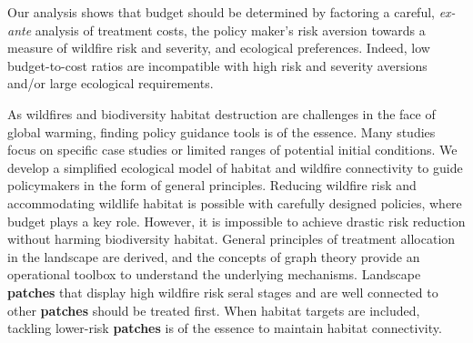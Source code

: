 Our analysis shows that budget should be determined by factoring a careful, \textit{ex-ante} analysis of treatment costs, the policy maker's risk aversion towards a measure of wildfire risk and severity, and ecological preferences.  Indeed, low budget-to-cost ratios are incompatible with high risk and severity aversions and/or large ecological requirements.

As wildfires and biodiversity habitat destruction are challenges in the face of global warming, finding policy guidance tools is of the essence. Many studies focus on specific case studies or limited ranges of potential initial conditions. We develop a simplified ecological model of habitat and wildfire connectivity to guide policymakers in the form of general principles. Reducing wildfire risk and accommodating wildlife habitat is possible with carefully designed policies, where budget plays a key role. However, it is impossible to achieve drastic risk reduction without harming biodiversity habitat. General principles of treatment allocation in the landscape are derived, and the concepts of graph theory provide an operational toolbox to understand the underlying mechanisms. Landscape \textbf{patches} that display high wildfire risk seral stages and are well connected to other \textbf{patches} should be treated first. When habitat targets are included, tackling lower-risk \textbf{patches} is of the essence to maintain habitat connectivity. 



